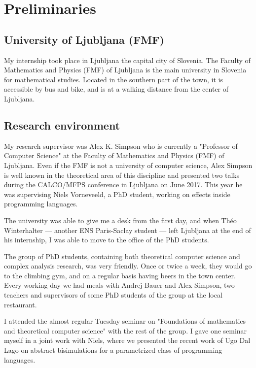 \section{Preliminaries}


\subsection{University of Ljubljana (FMF)}

My internship took place in Ljubljana the capital city of Slovenia.
The Faculty of Mathematics and Physics (FMF) of Ljubljana is 
the main university in Slovenia for mathematical studies. Located 
in the southern part of the town, it is accessible by bus and bike,
and is at a walking distance from the center of Ljubljana.

\subsection{Research environment}

My research supervisor was Alex K. Simpson
who is currently a 
"Professor of Computer Science" at the Faculty of Mathematics and Physics (FMF)
of Ljubljana.
Even if the FMF is not a university of computer science,
Alex Simpson is well known in the theoretical area of 
this discipline and presented two talks during the 
CALCO/MFPS conference in Ljubljana on June 2017. 
This year he was 
supervising Niels Vorneveeld, a PhD student, working 
on effects inside programming languages.

The university was able to give me a desk from the first 
day, and when Théo Winterhalter — another 
ENS Paris-Saclay student — left Ljubljana at the end 
of his internship, I was able to move to the office of 
the PhD students. 

The group of PhD students, containing both theoretical 
computer science and complex analysis research,
was very friendly. Once or twice a week, they would 
go to the climbing gym, and on a regular basis having beers 
in the town center. Every working day we had meals 
with Andrej Bauer and Alex Simpson, two teachers and 
supervisors of some PhD students of the group at the 
local restaurant.

I attended the almost regular 
Tuesday seminar on "Foundations of mathematics and theoretical computer science"
with the rest of the group.
I gave one seminar myself in a joint work with Niels, where 
we presented the recent work of Ugo Dal Lago \cite{Ugo2017} on 
abstract bisimulations for a parametrized class of programming languages.

